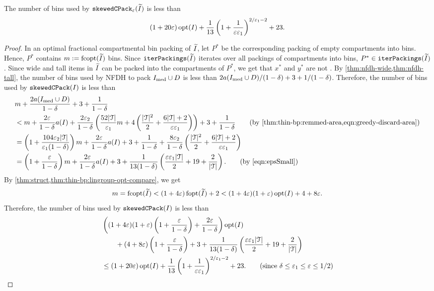 \begin{theorem}
The number of bins used by $\operatorname{\mathtt{skewedCPack}}_{\varepsilon}(\widetilde{I})$ is less than
\[ (1+20\varepsilon)\operatorname{opt}(I)
    + \frac{1}{13}\left(1 + \frac{1}{\varepsilon\varepsilon_1}\right)^{2/\varepsilon_1 - 2} + 23. \]
\end{theorem}
\begin{proof}
In an optimal fractional compartmental bin packing of $\widetilde{I}$,
let $P^*$ be the corresponding packing of empty compartments into bins.
Hence, $P^*$ contains $m := \operatorname{fcopt}(\widetilde{I})$ bins.
Since $\operatorname{\mathtt{iterPackings}}(\widetilde{I})$ iterates over all packings of compartments into bins,
$P^* \in \operatorname{\mathtt{iterPackings}}(\widetilde{I})$.
Since wide and tall items in $\widetilde{I}$ can be packed into the compartments of $P^*$,
we get that $x^*$ and $y^*$ are not \Null.
By \cref{thm:nfdh-wide,thm:nfdh-tall}, the number of bins used by NFDH to pack
$I_{\mathrm{med}} \cup D$ is less than $2a(I_{\mathrm{med}} \cup D)/(1-\delta) + 3 + 1/(1-\delta)$.
Therefore, the number of bins used by $\operatorname{\mathtt{skewedCPack}}(I)$ is less than
\begin{align*}
& m + \frac{2a(\Imed \cup D)}{1-\delta} + 3 + \frac{1}{1-\delta}
\\ &< m + \frac{2\eps}{1-\delta}a(I)
    + \frac{2\epsSmall}{1-\delta}\left(\frac{52|\Tcal|}{\epsLarge} m
        + 4\left(\frac{|\Tcal|^2}{2} + \frac{6|\Tcal|+2}{\eps\epsLarge}\right)\right)
    + 3 + \frac{1}{1-\delta}
    \tag{by \cref{thm:thin-bp:remmed-area,eqn:greedy-discard-area}}
\\ &= \left(1 + \frac{104\epsSmall|\Tcal|}{\epsLarge(1-\delta)}\right)m
    + \frac{2\eps}{1-\delta}a(I)
    + 3 + \frac{1}{1-\delta} + \frac{8\epsSmall}{1-\delta}\left(
        \frac{|\Tcal|^2}{2} + \frac{6|\Tcal|+2}{\eps\epsLarge}\right)
\\ &= \left(1 + \frac{\eps}{1-\delta}\right)m + \frac{2\eps}{1-\delta}a(I)
    + 3 + \frac{1}{13(1-\delta)}\left(\frac{\eps\epsLarge|\Tcal|}{2}
        + 19 + \frac{2}{|\Tcal|}\right).
    \tag{by \cref{eqn:epsSmall}}
\end{align*}
By \cref{thm:struct,thm:thin-bp:lingroup-opt-compare}, we get
\[ m = \operatorname{fcopt}(\widetilde{I}) < (1+4\varepsilon)\operatorname{fopt}(\widetilde{I}) + 2
< (1+4\varepsilon)(1+\varepsilon)\operatorname{opt}(I) + 4 + 8\varepsilon. \]
Therefore, the number of bins used by $\operatorname{\mathtt{skewedCPack}}(I)$ is less than
\begin{align*}
& \left((1+4\eps)(1+\eps)\left(1 + \frac{\eps}{1-\delta}\right)
    + \frac{2\eps}{1-\delta}\right)\opt(I)
\\ &\qquad + (4 + 8\eps)\left(1 + \frac{\eps}{1-\delta}\right) + 3
    + \frac{1}{13(1-\delta)}\left(\frac{\eps\epsLarge|\Tcal|}{2} + 19 + \frac{2}{|\Tcal|}\right)
\\ &\le (1+20\eps)\opt(I)
    + \frac{1}{13}\left(1 + \frac{1}{\eps\epsLarge}\right)^{2/\epsLarge - 2} + 23.
    \tag{since $\delta \le \epsLarge \le \eps \le 1/2$}
\end{align*}
\end{proof}
